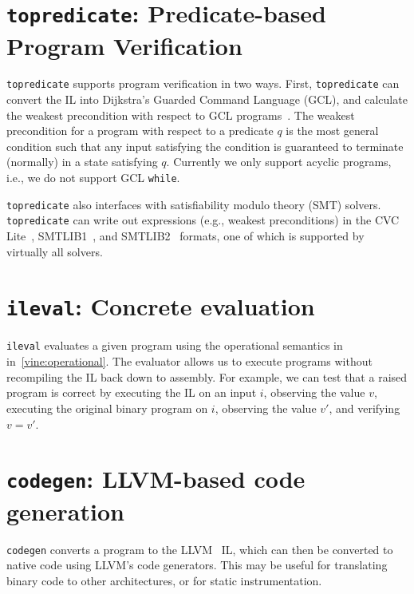 \section{{\tt topredicate}: Predicate-based Program Verification}

{\tt topredicate} supports program verification in two ways. First,
{\tt topredicate} can convert the IL into Dijkstra's Guarded Command
Language (GCL), and calculate the weakest precondition with respect to
GCL programs~\cite{dijkstra:1976}. The weakest precondition for a
program with respect to a predicate $q$ is the most general condition
such that any input satisfying the condition is guaranteed to
terminate (normally) in a state satisfying $q$.  Currently we only
support acyclic programs, i.e., we do not support GCL {\tt while}.

{\tt topredicate} also interfaces with satisfiability modulo theory
(SMT) solvers.  {\tt topredicate} can write out expressions (e.g.,
weakest preconditions) in the CVC Lite~\cite{cvclite},
SMTLIB1~\cite{smtlib1}, and SMTLIB2~\cite{smtlib2} formats, one of which
is supported by virtually all solvers.

\section{{\tt ileval}: Concrete evaluation} 

{\tt ileval} evaluates a given \bil
program using the operational semantics in in~\ref{vine:operational}.
The evaluator allows us to execute programs without recompiling the IL
back down to assembly. For example, we can test that a raised program
is correct by executing the IL on an input $i$, observing the value $v$,
executing the original binary program on $i$, observing the value
$v'$, and verifying $v = v'$.

\section{\texttt{codegen}: LLVM-based code generation}

\texttt{codegen} converts a \bil program to the LLVM~\cite{llvm} IL,
which can then be converted to native code using LLVM's code
generators.  This may be useful for translating binary code to other
architectures, or for static instrumentation.



